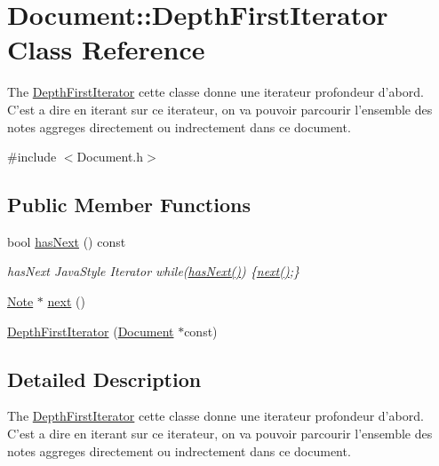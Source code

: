 \hypertarget{class_document_1_1_depth_first_iterator}{\section{Document\-:\-:Depth\-First\-Iterator Class Reference}
\label{class_document_1_1_depth_first_iterator}
}


The \hyperlink{class_document_1_1_depth_first_iterator}{Depth\-First\-Iterator} cette classe donne une iterateur profondeur d'abord. C'est a dire en iterant sur ce iterateur, on va pouvoir parcourir l'ensemble des notes aggreges directement ou indrectement dans ce document.  




{\ttfamily \#include $<$Document.\-h$>$}

\subsection*{Public Member Functions}
\begin{DoxyCompactItemize}
\item 
bool \hyperlink{class_document_1_1_depth_first_iterator_a0a9e81968ff13ccd46e9c933e617d5f6}{has\-Next} () const 
\begin{DoxyCompactList}\small\item\em has\-Next Java\-Style Iterator while(\hyperlink{class_document_1_1_depth_first_iterator_a0a9e81968ff13ccd46e9c933e617d5f6}{has\-Next()}) \{\hyperlink{class_document_1_1_depth_first_iterator_aeebdd420c34e4f72a14855c88c87048f}{next()};\} \end{DoxyCompactList}\item 
\hyperlink{class_note}{Note} $\ast$ \hyperlink{class_document_1_1_depth_first_iterator_aeebdd420c34e4f72a14855c88c87048f}{next} ()
\item 
\hyperlink{class_document_1_1_depth_first_iterator_aa39c28cd60bf85eb993dc84c4144acda}{Depth\-First\-Iterator} (\hyperlink{class_document}{Document} $\ast$const)
\end{DoxyCompactItemize}


\subsection{Detailed Description}
The \hyperlink{class_document_1_1_depth_first_iterator}{Depth\-First\-Iterator} cette classe donne une iterateur profondeur d'abord. C'est a dire en iterant sur ce iterateur, on va pouvoir parcourir l'ensemble des notes aggreges directement ou indrectement dans ce document. 

